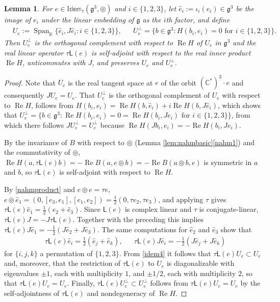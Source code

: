 \documentclass [leqno, 10pt]{amsart}
\newtheorem{lemma}[theorem]{Lemma}%
\theoremstyle{definition}
\numberwithin{equation}{section}
\newcommand{\idem}{\mathbb{Idem}}
\newcommand{\tmlt}{\circledcirc}
\newcommand{\lin}{\mathsf{L}}
\newcommand{\re}{\operatorname{Re}}
\newcommand{\spn}{\operatorname{Span}}
\newcommand{\g}{\mathfrak{g}}
\newcommand{\rea}{\mathbb R}
\newcommand{\com}{\mathbb C}
\newcommand{\Usp}{U}
\newcommand{\Uperp}{\Usp^{\perp}}
\begin{document}
\begin{lemma}\label{hess2}
For $e \in \idem_{\tau}(\g^{3}, \tmlt)$ and $i \in \{1, 2, 3\}$, let $\hat{e}_{i} := \iota_{i}(e_{i}) \in \g^{3}$ be the image of $e_{i}$ under the linear embedding of $\g$ as the $i$th factor, and define
\begin{align}\label{eq:UR}
&\Usp_{e} := \spn_{\rea}\{\hat{e}_{i}, J\hat{e}_{i}: i \in \{1, 2, 3\}\}, &
&\Uperp_{e} = \{b \in \g^{3}: H(b_{i}, e_{i}) = 0 \text{ for } i \in \{1, 2, 3\}\}.
\end{align}
Then $\Uperp_{e}$ is the orthogonal complement with respect to $\re H$ of $\Usp_{e}$ in $\g^3$ and the real linear operator $\tau\lin(e)$ is self-adjoint with respect to the real inner product $\re H$, anticommutes with $J$, and preserves $\Usp_{e}$ and $\Uperp_{e}$.
\end{lemma}
\begin{proof}
Note that $\Usp_{e}$ is the real tangent space at $e$ of the orbit $(\com^{\ast})^{3}\cdot e$ and consequently $J\Usp_{e} = \Usp_{e}$. That $\Uperp_{e}$ is the orthogonal complement of $\Usp_{e}$ with respect to $\re H$, follows from $H(b_{i}, e_{i}) = \re H(b, \hat{e}_{i}) + i\re H(b, J\hat{e}_{i})$, which shows that $\Uperp_{e} = \{b \in \g^{3}: \re H(b_{i}, e_{i}) = 0 = \re H(b_{i}, Je_{i}) \text{ for } i \in \{1, 2, 3\}\}$, from which there follows $J\Uperp_{e} = \Uperp_{e}$ because $\re H(Jb_{i}, e_{i}) = - \re H(b_{i}, Je_{i})$.

By the invariance of $B$ with respect to $\tmlt$ (Lemma \ref{lem:nahmbasic}\ref{nahm1}) and the commutativity of $\tmlt$, $\re H(a, \tau\lin(e)b) = -\re B(a, e \tmlt b) = -\re B(a\tmlt b, e)$ is symmetric in $a$ and $b$, so $\tau\lin(e)$ is self-adjoint with respect to $\re H$.

By \eqref{nahmproduct} and $e \tmlt e = \tau e$, $e \tmlt \hat{e}_{1} = (0, [e_{3}, e_{1}], [e_{1}, e_{2}]) = \tfrac{1}{2}(0, \tau e_{2}, \tau e_{3})$, and applying $\tau$ gives $\tau\lin(e)\hat{e}_{1} = \tfrac{1}{2}(\hat{e}_{2} + \hat{e}_{3})$. Since $\lin(e)$ is complex linear and $\tau$ is conjugate-linear, $\tau\lin(e)J = -J\tau\lin(e)$. Together with the preceding this implies $\tau\lin(e)J\hat{e}_{1} = -\tfrac{1}{2}(J\hat{e}_{2} + J\hat{e}_{3})$. The same computations for $\hat{e}_{2}$ and $\hat{e}_{3}$ show that
\begin{align}\label{idem4}
&\tau\lin(e)\hat{e}_{i} = \tfrac{1}{2}(\hat{e}_{j} + \hat{e}_{k}), && \tau\lin(e)J\hat{e}_{i} = -\tfrac{1}{2}(J\hat{e}_{j} + J\hat{e}_{k})
\end{align}
for $\{i, j, k\}$ a permutation of $\{1, 2, 3\}$. From \eqref{idem4} it follows that $\tau\lin(e)\Usp_{e} \subset \Usp_{e}$ and, moreover, that the restriction of $\tau \lin(e)$ to $\Usp_{e}$ is diagonalizable with eigenvalues $\pm 1$, each with multiplicity $1$, and $\pm 1/2$, each with multiplicity $2$, so that $\tau\lin(e)\Usp_{e} = \Usp_{e}$.
Finally, $\tau\lin(e)\Uperp_{e} \subset \Uperp_{e}$ follows from $\tau \lin(e)\Usp_{e} = \Usp_{e}$ by the self-adjointness of $\tau\lin(e)$ and nondegeneracy of $\re H$.
\end{proof}
\end{document}
